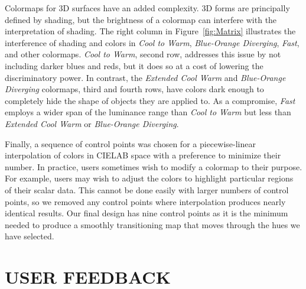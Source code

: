 \documentclass{IEEEcsmag}
\newcommand*{\colormap}[1]{\textsl{#1}\xspace}
\newcommand*{\coolwarm}{\colormap{Cool to Warm}}
\newcommand*{\blueorange}{\colormap{Blue-Orange Diverging}}
\newcommand*{\fast}{\colormap{Fast}}
\newcommand*{\extendedcoolwarm}{\colormap{Extended Cool Warm}}
\begin{document}
Colormaps for 3D surfaces have an added complexity.
3D forms are principally defined by shading, but the brightness of a colormap can interfere with the interpretation of shading.
The right column in Figure~\ref{fig:Matrix} illustrates the interference of shading and colors in \coolwarm, \blueorange, \fast, and other colormaps.
\coolwarm, second row, addresses this issue by not including darker blues and reds, but it does so at a cost of lowering the discriminatory power.
In contrast, the \extendedcoolwarm and \blueorange colormaps, third and fourth rows, have colors dark enough to completely hide the shape of objects they are applied to.
As a compromise, \fast employs a wider span of the luminance range than \coolwarm but less than \extendedcoolwarm or \blueorange.


Finally, a sequence of control points was chosen for a piecewise-linear interpolation of colors in CIELAB space with a preference to minimize their number.
In practice, users sometimes wish to modify a colormap to their purpose.
For example, users may wish to adjust the colors to highlight particular regions of their scalar data.
This cannot be done easily with larger numbers of control points, so we removed any control points where interpolation produces nearly identical results.
Our final design has nine control points as it is the minimum needed to produce a smoothly transitioning map that moves through the hues we have selected.



\section{USER FEEDBACK}
\end{document}
